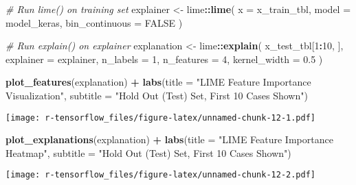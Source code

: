 \documentclass[]{article}
\newenvironment{Shaded}{\begin{snugshade}}{\end{snugshade}}
\newcommand{\KeywordTok}[1]{\textcolor[rgb]{0.13,0.29,0.53}{\textbf{#1}}}
\newcommand{\DataTypeTok}[1]{\textcolor[rgb]{0.13,0.29,0.53}{#1}}
\newcommand{\DecValTok}[1]{\textcolor[rgb]{0.00,0.00,0.81}{#1}}
\newcommand{\FloatTok}[1]{\textcolor[rgb]{0.00,0.00,0.81}{#1}}
\newcommand{\StringTok}[1]{\textcolor[rgb]{0.31,0.60,0.02}{#1}}
\newcommand{\CommentTok}[1]{\textcolor[rgb]{0.56,0.35,0.01}{\textit{#1}}}
\newcommand{\OtherTok}[1]{\textcolor[rgb]{0.56,0.35,0.01}{#1}}
\newcommand{\OperatorTok}[1]{\textcolor[rgb]{0.81,0.36,0.00}{\textbf{#1}}}
\newcommand{\NormalTok}[1]{#1}
\begin{document}
\begin{Shaded}
\begin{Highlighting}[]
\CommentTok{# Run lime() on training set}
\NormalTok{explainer <-}\StringTok{ }\NormalTok{lime}\OperatorTok{::}\KeywordTok{lime}\NormalTok{(}
  \DataTypeTok{x              =}\NormalTok{ x_train_tbl, }
  \DataTypeTok{model          =}\NormalTok{ model_keras, }
  \DataTypeTok{bin_continuous =} \OtherTok{FALSE}
\NormalTok{)}

\CommentTok{# Run explain() on explainer}
\NormalTok{explanation <-}\StringTok{ }\NormalTok{lime}\OperatorTok{::}\KeywordTok{explain}\NormalTok{(}
\NormalTok{  x_test_tbl[}\DecValTok{1}\OperatorTok{:}\DecValTok{10}\NormalTok{, ], }
  \DataTypeTok{explainer    =}\NormalTok{ explainer, }
  \DataTypeTok{n_labels     =} \DecValTok{1}\NormalTok{, }
  \DataTypeTok{n_features   =} \DecValTok{4}\NormalTok{,}
  \DataTypeTok{kernel_width =} \FloatTok{0.5}
\NormalTok{)}

\KeywordTok{plot_features}\NormalTok{(explanation) }\OperatorTok{+}
\StringTok{  }\KeywordTok{labs}\NormalTok{(}\DataTypeTok{title =} \StringTok{"LIME Feature Importance Visualization"}\NormalTok{,}
       \DataTypeTok{subtitle =} \StringTok{"Hold Out (Test) Set, First 10 Cases Shown"}\NormalTok{)}
\end{Highlighting}
\end{Shaded}

\texttt{[image: r-tensorflow\_files/figure-latex/unnamed-chunk-12-1.pdf]}

\begin{Shaded}
\begin{Highlighting}[]
\KeywordTok{plot_explanations}\NormalTok{(explanation) }\OperatorTok{+}
\StringTok{  }\KeywordTok{labs}\NormalTok{(}\DataTypeTok{title =} \StringTok{"LIME Feature Importance Heatmap"}\NormalTok{,}
       \DataTypeTok{subtitle =} \StringTok{"Hold Out (Test) Set, First 10 Cases Shown"}\NormalTok{)}
\end{Highlighting}
\end{Shaded}

\texttt{[image: r-tensorflow\_files/figure-latex/unnamed-chunk-12-2.pdf]}

\begin{Shaded}
\end{Shaded}
\end{document}
